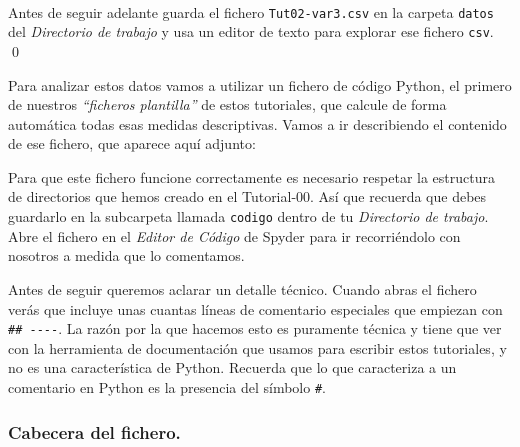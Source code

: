 \documentclass[10pt,a4paper]{article}\usepackage[]{graphicx}\usepackage[]{color}
\newcounter {cont01}
\begin{document}
\begin{ejercicio}
\label{tut02:ejercicio23}
\quad\\
Antes de seguir adelante guarda el fichero {\tt Tut02-var3.csv} en la carpeta {\tt datos} del {\em Directorio de trabajo} y usa un editor de texto para explorar ese fichero {\tt csv}.
\qed
\end{ejercicio}

Para analizar estos datos vamos a utilizar un fichero de código Python, el primero de nuestros {\em ``ficheros plantilla''} de estos tutoriales, que calcule de forma automática todas esas medidas descriptivas. Vamos a ir describiendo el contenido de ese fichero, que aparece aquí adjunto:
\begin{center}
\end{center}
Para que este fichero funcione correctamente es necesario respetar la estructura de directorios que hemos creado en el Tutorial-00. Así que recuerda que debes guardarlo en la subcarpeta llamada {\tt codigo} dentro de tu {\em Directorio de trabajo}. Abre el fichero en el {\em Editor de Código} de Spyder para ir recorriéndolo con nosotros a medida que lo comentamos. 

Antes de seguir queremos aclarar un detalle técnico. Cuando abras el fichero verás que incluye unas cuantas líneas de comentario especiales que empiezan con \verb&## ----&. La razón por la que hacemos esto es puramente técnica y tiene que ver con la herramienta de documentación que usamos para escribir estos tutoriales, y no es una característica de Python. Recuerda que lo que caracteriza a un comentario en Python es la presencia del símbolo \verb&#&. 



\subsubsection*{Cabecera del fichero.}
\label{tut02:subsubsec:cabeceraFichero}
\end{document}
